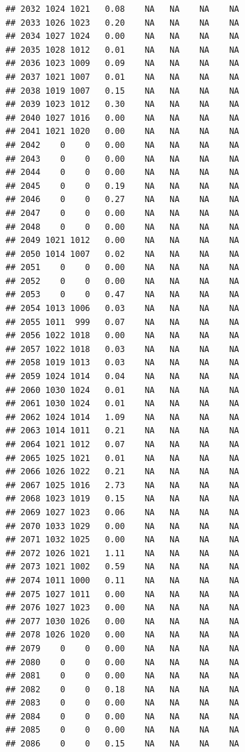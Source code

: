 \documentclass{article}\usepackage{graphicx, color}
\makeatletter
\newenvironment{kframe}{%
 \def\at@end@of@kframe{}%
 \ifinner\ifhmode%
  \def\at@end@of@kframe{\end{minipage}}%
  \begin{minipage}{\columnwidth}%
 \fi\fi%
 \def\FrameCommand##1{\hskip\@totalleftmargin \hskip-\fboxsep
 \colorbox{shadecolor}{##1}\hskip-\fboxsep
     \hskip-\linewidth \hskip-\@totalleftmargin \hskip\columnwidth}%
 \MakeFramed {\advance\hsize-\width
   \@totalleftmargin\z@ \linewidth\hsize
   \@setminipage}}%
 {\par\unskip\endMakeFramed%
 \at@end@of@kframe}
\newenvironment{knitrout}{}{} %
\makeatother
\begin{document}
\begin{knitrout}
\begin{kframe}
\begin{verbatim}
## 2032 1024 1021   0.08    NA   NA    NA    NA
## 2033 1026 1023   0.20    NA   NA    NA    NA
## 2034 1027 1024   0.00    NA   NA    NA    NA
## 2035 1028 1012   0.01    NA   NA    NA    NA
## 2036 1023 1009   0.09    NA   NA    NA    NA
## 2037 1021 1007   0.01    NA   NA    NA    NA
## 2038 1019 1007   0.15    NA   NA    NA    NA
## 2039 1023 1012   0.30    NA   NA    NA    NA
## 2040 1027 1016   0.00    NA   NA    NA    NA
## 2041 1021 1020   0.00    NA   NA    NA    NA
## 2042    0    0   0.00    NA   NA    NA    NA
## 2043    0    0   0.00    NA   NA    NA    NA
## 2044    0    0   0.00    NA   NA    NA    NA
## 2045    0    0   0.19    NA   NA    NA    NA
## 2046    0    0   0.27    NA   NA    NA    NA
## 2047    0    0   0.00    NA   NA    NA    NA
## 2048    0    0   0.00    NA   NA    NA    NA
## 2049 1021 1012   0.00    NA   NA    NA    NA
## 2050 1014 1007   0.02    NA   NA    NA    NA
## 2051    0    0   0.00    NA   NA    NA    NA
## 2052    0    0   0.00    NA   NA    NA    NA
## 2053    0    0   0.47    NA   NA    NA    NA
## 2054 1013 1006   0.03    NA   NA    NA    NA
## 2055 1011  999   0.07    NA   NA    NA    NA
## 2056 1022 1018   0.00    NA   NA    NA    NA
## 2057 1022 1018   0.03    NA   NA    NA    NA
## 2058 1019 1013   0.03    NA   NA    NA    NA
## 2059 1024 1014   0.04    NA   NA    NA    NA
## 2060 1030 1024   0.01    NA   NA    NA    NA
## 2061 1030 1024   0.01    NA   NA    NA    NA
## 2062 1024 1014   1.09    NA   NA    NA    NA
## 2063 1014 1011   0.21    NA   NA    NA    NA
## 2064 1021 1012   0.07    NA   NA    NA    NA
## 2065 1025 1021   0.01    NA   NA    NA    NA
## 2066 1026 1022   0.21    NA   NA    NA    NA
## 2067 1025 1016   2.73    NA   NA    NA    NA
## 2068 1023 1019   0.15    NA   NA    NA    NA
## 2069 1027 1023   0.06    NA   NA    NA    NA
## 2070 1033 1029   0.00    NA   NA    NA    NA
## 2071 1032 1025   0.00    NA   NA    NA    NA
## 2072 1026 1021   1.11    NA   NA    NA    NA
## 2073 1021 1002   0.59    NA   NA    NA    NA
## 2074 1011 1000   0.11    NA   NA    NA    NA
## 2075 1027 1011   0.00    NA   NA    NA    NA
## 2076 1027 1023   0.00    NA   NA    NA    NA
## 2077 1030 1026   0.00    NA   NA    NA    NA
## 2078 1026 1020   0.00    NA   NA    NA    NA
## 2079    0    0   0.00    NA   NA    NA    NA
## 2080    0    0   0.00    NA   NA    NA    NA
## 2081    0    0   0.00    NA   NA    NA    NA
## 2082    0    0   0.18    NA   NA    NA    NA
## 2083    0    0   0.00    NA   NA    NA    NA
## 2084    0    0   0.00    NA   NA    NA    NA
## 2085    0    0   0.00    NA   NA    NA    NA
## 2086    0    0   0.15    NA   NA    NA    NA

\end{verbatim}
\end{kframe}
\end{knitrout}
\end{document}
